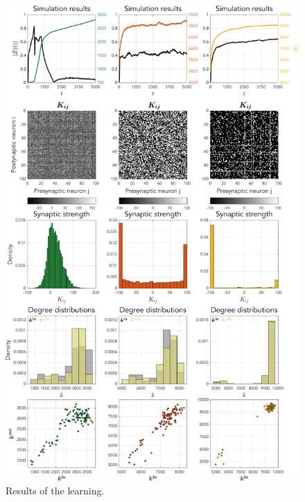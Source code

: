 \newpage
\begin{figure}[H]
\centering
\includegraphics[height = \textheight]{../Figures/Learning/STDP.pdf}
\caption{Results of the \STDP learning.}
\label{fig:STDP}
\end{figure}

